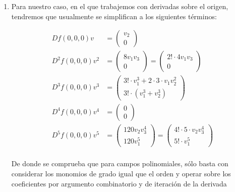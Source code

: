 \begin{exmp}
\begin{enumerate}
		\begin{equation*}
			v^t H(f_1)(x_0,y_0,z_0) v^2 = \begin{pmatrix}
				v_1&
				v_2&
				v_3
			\end{pmatrix} \begin{bmatrix}
				6x_0 & 6y_0 & 4 \\
				6y_0 & 6x_0 & 4z_0^3 \\
				4 & 4z_0^3 & 12y_0z_0^2
			\end{bmatrix} \begin{pmatrix}
				v_1\\
				v_2\\
				v_3
			\end{pmatrix} 
		\end{equation*}
		
		\item Para nuestro caso, en el que trabajemos con derivadas sobre el origen, tendremos que usualmente se simplifican a los siguientes términos: 
		
		\begin{align*}
			D f(0,0,0) v 
			&= \begin{pmatrix}
				v_2   \\
				0    
			\end{pmatrix} \\
			D^2 f(0,0,0) v^2 
			&= \begin{pmatrix}
				8v_1v_3   \\
				0    
			\end{pmatrix} = \begin{pmatrix}
				2!\cdot 4v_1v_3   \\
				0    
			\end{pmatrix} \\
			D^3 f(0,0,0) v^3 
			&= \begin{pmatrix}
				3!\cdot v_1^3 + 2\cdot 3 \cdot v_1v_2^2   \\
				3! \cdot (v_1^3+v_2^3)    
			\end{pmatrix} \\
			D^4 f(0,0,0) v^4 
			&= \begin{pmatrix}
				0   \\
				0 
			\end{pmatrix} \\
			D^5 f(0,0,0) v^5 
			&= \begin{pmatrix}
				120v_2v_3^4   \\
				120v_1^5
			\end{pmatrix} = \begin{pmatrix}
				4! \cdot 5 \cdot v_2v_3^4   \\
				5! \cdot v_1^5
			\end{pmatrix} \\
		\end{align*}
		
		De donde se comprueba que para campos polinomiales, sólo basta con considerar los monomios de grado igual que el orden y operar sobre los coeficientes por argumento combinatorio y de iteración de la derivada
	\end{enumerate}
\end{exmp}

